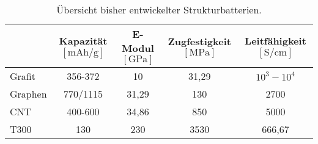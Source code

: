\begin{table}[ht]
    \centering
    \caption{Übersicht bisher entwickelter Strukturbatterien.}
    \begin{tabular}[t]{lcccc}
    \toprule
    &\makecell{Kapazität\\$\left[ \si{\mA \hour \per \g} \right]$} %
    &\makecell{E-Modul\\ $\left[ \si{\GPa} \right]$}
    &\makecell{Zugfestigkeit\\ $\left[ \si{\MPa} \right]$}
    &\makecell{Leitfähigkeit\\ $\left[ \si{\siemens \per \cm} \right]$}
    \\
    \midrule
    Grafit
        &356-372 \cite{Winter1998} %
        &10 \cite{Lin2023} %
        &31,29 \cite{Lin2023} %
        &$10^3-10^4$ \cite{Wang2021} %
        \\
    Graphen
        &770/1115 \cite{Wu2011} %
        &31,29 \cite{Lin2023}  %
        &130 \cite{Lin2023} %
        &2700 \cite{Murata2019} %
        \\
    CNT
        &400-600 \cite{Boaretto2020}
        &34,86 \cite{Kim2017}
        &850 \cite{Kim2017}
        &5000 \cite{Charlier2007}
        \\
    T300
        &130 \cite{Kjell2011}
        &230 \cite{Kjell2011}
        &3530 \cite{Kjell2011}
        &666,67\cite{Kjell2011}

\end{tabular}
\end{table}
